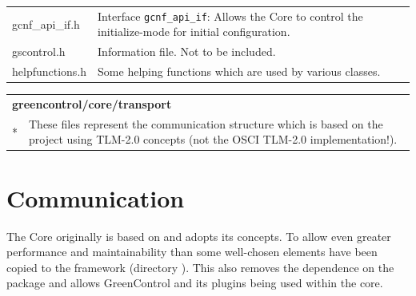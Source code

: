 \begin{minipage}{\textwidth}
\begin{tabularx}{\textwidth}{|l|X|}
	\cline{1-1}\cline{2-2} gcnf\_api\_if.h    &  Interface \lstinline|gcnf_api_if|: Allows the \GreenControl Core to control the initialize-mode for initial configuration.   \\ 
	\cline{1-1}\cline{2-2} gscontrol.h    &  Information file. Not to be included.  \\ 
	\cline{1-1}\cline{2-2} helpfunctions.h    &  Some helping functions which are used by various classes.  \\ 
	\hline
\end{tabularx}
\end{minipage}

\vspace{1 cm}

\noindent
\begin{minipage}{\textwidth}
\begin{tabularx}{\textwidth}{|l|X|}
	\cline{1-1}\cline{2-2}\multicolumn{2}{|l|}{  {\bf greencontrol/core/transport}    }\\ 
	\cline{1-1}\cline{2-2} *    &  These files represent the communication structure which is based on the \GreenBus project using TLM-2.0 concepts (not the OSCI TLM-2.0 implementation!).  \\ 
	\hline
\end{tabularx}
\end{minipage}

\vspace{1 cm}


\section{Communication}

The \GreenControl Core originally is based on \GreenBus and adopts its concepts. To allow even greater performance and maintainability than \GreenBus some well-chosen elements have been copied to the \GreenControl framework (directory ). This also removes the dependence on the \GreenBus package and allows GreenControl and its plugins being used within the \GreenBus core.


